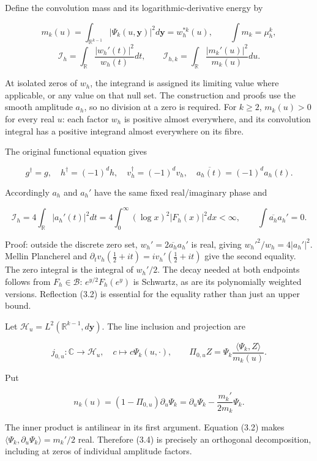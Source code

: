Define the convolution mass and its logarithmic-derivative energy by

\[m_k(u)=\int_{\mathbb R^{k-1}}|\Psi_k(u,\mathbf y)|^2d\mathbf y=w_h^{*k}(u),\qquad \int m_k=\mu_h^k,\]
\[\mathcal I_h=\int_{\mathbb R}\frac{|w_h'(t)|^2}{w_h(t)}dt,\qquad \mathcal I_{h,k}=\int_{\mathbb R}\frac{|m_k'(u)|^2}{m_k(u)}du.\tag{3.1}\]

At isolated zeros of \(w_h\), the integrand is assigned its limiting
value where applicable, or any value on that null set. The construction
and proofs use the smooth amplitude \(a_h\), so no division at a zero is
required. For \(k\ge2\), \(m_k(u)>0\) for every real \(u\): each factor
\(w_h\) is positive almost everywhere, and its convolution integral has
a positive integrand almost everywhere on its fibre.

The original functional equation gives

\[g^\dagger=g,\quad h^\dagger=(-1)^dh,\quad v_h^\dagger=(-1)^dv_h,\quad
\overline{a_h(t)}=(-1)^da_h(t).\tag{3.2}\]

Accordingly \(a_h\) and \(a_h'\) have the same fixed real/imaginary
phase and

\[\boxed{\mathcal I_h=4\int_{\mathbb R}|a_h'(t)|^2dt=4\int_0^\infty(\log x)^2|F_h(x)|^2dx<\infty,\qquad \int\overline{a_h}a_h'=0.}\tag{3.3}\]

Proof: outside the discrete zero set, \(w_h'=2\overline{a_h}a_h'\) is
real, giving \(w_h'^2/w_h=4|a_h'|^2\). Mellin Plancherel and
\(\partial_tv_h(\tfrac12+it)=iv_h'(\tfrac12+it)\) give the second
equality. The zero integral is the integral of \(w_h'/2\). The decay
needed at both endpoints follows from \(F_h\in\mathscr B\):
\(e^{y/2}F_h(e^y)\) is Schwartz, as are its polynomially weighted
versions. Reflection (3.2) is essential for the equality rather than
just an upper bound.

Let \(\mathscr H_u=L^2(\mathbb R^{k-1},d\mathbf y)\). The line inclusion
and projection are

\[j_{0,u}:\mathbb C\to\mathscr H_u,\quad c\mapsto c\Psi_k(u,\cdot),\qquad
\Pi_{0,u}Z=\Psi_k\frac{\langle\Psi_k,Z\rangle}{m_k(u)}.\]

Put

\[n_k(u)=(1-\Pi_{0,u})\partial_u\Psi_k=\partial_u\Psi_k-\frac{m_k'}{2m_k}\Psi_k.\tag{3.4}\]

The inner product is antilinear in its first argument. Equation (3.2)
makes \(\langle\Psi_k,\partial_u\Psi_k\rangle=m_k'/2\) real. Therefore
(3.4) is precisely an orthogonal decomposition, including at zeros of
individual amplitude factors.

